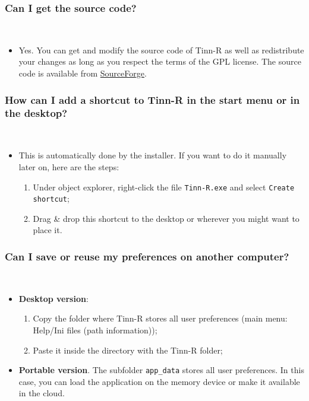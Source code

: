 \subsubsection{Can I get the source code?}\\

\begin{itemize}
  \item Yes. You can get and modify the source code of Tinn-R as well
    as redistribute your changes as long as you respect the terms of
    the GPL license. The source code is available from
    \href{https://sourceforge.net/projects/tinn-r/}{SourceForge}.
\end{itemize}


\subsubsection{How can I add a shortcut to Tinn-R in the start menu or in the desktop?}\\

\begin{itemize}
  \item This is automatically done by the installer.
    If you want to do it manually later on, here are the steps:
    \begin{enumerate}
      \item Under object explorer, right-click the file \texttt{Tinn-R.exe}
        and select \texttt{Create shortcut};
      \item Drag \& drop this shortcut to the desktop or wherever you
        might want to place it.
    \end{enumerate}
\end{itemize}


\hypertarget{faq_preferences}{}
\subsubsection{Can I save or reuse my preferences on another computer?}\\

\begin{itemize}
  \item \textbf{Desktop version}:
    \begin{enumerate}
      \item Copy the folder where Tinn-R stores all user preferences
        (main menu: Help/Ini files (path information));
      \item Paste it inside the directory with the Tinn-R folder;
    \end{enumerate}
  \item \textbf{Portable version}. The subfolder \texttt{app\_data} stores all user preferences.
    In this case, you can load the application on the memory device or make it available in the cloud.
\end{itemize}



